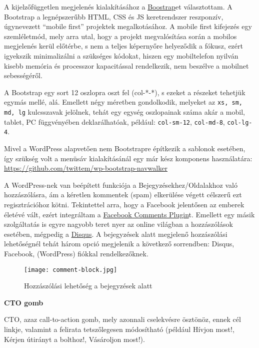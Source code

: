 A kijelzőfüggetlen megjelenés kialakításához a \href{http://getbootstrap.com/}{Boostrap}et választottam. A Bootstrap a legnépszerűbb HTML, CSS és JS keretrendszer reszponzív, úgynevezett ``mobile first'' projektek megalkotásához. A mobile first kifejezés egy szemléletmód, mely arra utal, hogy a projekt megvalósítása során a mobilos megjelenés kerül előtérbe, s nem a teljes képernyőre helyeződik a fókusz, ezért igyekszik minimalizálni a szükséges kódokat, hiszen egy mobiltelefon nyilván kisebb memória és processzor kapacitással rendelkezik, nem beszélve a mobilnet sebességéről.

A Bootstrap egy sort 12 oszlopra oszt fel (col-*-*), s ezeket a részeket tehetjük egymás mellé, alá. Emellett négy méretben gondolkodik, melyeket az \verb|xs, sm, md, lg| kulcsszavak jelölnek, tehát egy egység oszlopainak száma akár a mobil, tablet, PC függvényében deklarálhatóak, például: \texttt{col-sm-12}, \texttt{col-md-8}, \texttt{col-lg-4}.

Mivel a WordPress alapvetően nem Bootstrapre építkezik a sablonok esetében, így szükség volt a menüsáv kialakításánál egy már kész komponens használatára: \url{https://github.com/twittem/wp-bootstrap-navwalker}

\newpage



A WordPress-nek van beépített funkciója a Bejegyzésekhez/Oldalakhoz való hozzászólásra, ám a kéretlen kommentek (spam) elkerülése végett célszerű ezt regisztrációhoz kötni. Tekintettel arra, hogy a Facebook jelentősen az emberek életévé vált, ezért integráltam a \href{https://developers.facebook.com/docs/plugins/comments/}{Facebook Comments Plugin}t. Emellett egy másik szolgáltatás is egyre nagyobb teret nyer az online világban a hozzászólások esetében, mégpedig a \href{https://disqus.com/}{Disqus}. A bejegyzések alatt megjelenő hozzászólási lehetőségnél tehát három opció megjelenik a következő sorrendben: Disqus, Facebook, (WordPress) fiókkal rendelkezőknek.

\begin{figure}
	\texttt{[image: comment-block.jpg]}
	\caption{Hozzászólási lehetőség a bejegyzések alatt}
\end{figure}


\tab\textbf{CTO gomb}

CTO, azaz call-to-action gomb, mely azonnali cselekvésre ösztönöz, ennek cél linkje, valamint a felirata tetszőlegesen módosítható (például Hívjon most!, Kérjen útirányt a bolthoz!, Vásároljon most!).

